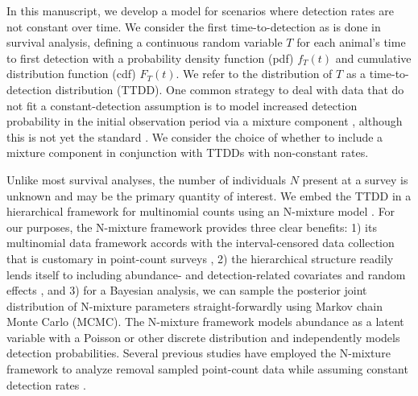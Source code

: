 \documentclass[useAMS,usenatbib,referee,12pt]{article}
\begin{document}

In this manuscript, we develop a model for scenarios where detection rates are not constant over time. 
We consider the first time-to-detection as is done in survival analysis, defining a continuous random variable $T$ for each animal's time to first detection with a probability density function (pdf) $f_T(t)$ and cumulative distribution function (cdf) $F_T(t)$.  
We refer to the distribution of $T$ as a time-to-detection distribution (TTDD).  
One common strategy to deal with data that do not fit a constant-detection assumption is to model increased detection probability in the initial observation period via a mixture component \citep{Farnsworth2002, Farnsworth2005, Alldredge2007, EffordDawson2009, Etterson2009, Reidy2011}, although this is not yet the standard \citep{Solymos2013, Amundson2014, Reidy2016}. 
We consider the choice of whether to include a mixture component in conjunction with TTDDs with non-constant rates.

Unlike most survival analyses, the number of individuals $N$ present at a survey is unknown and may be the primary quantity of interest.  
We embed the TTDD in a hierarchical framework for multinomial counts using an N-mixture model \citep{Wyatt2002, Royle2004NMixture}.  
For our purposes, the N-mixture framework provides three clear benefits: 1) its multinomial data framework accords with the interval-censored data collection that is customary in point-count surveys \citep{Ralph1995}, 2) the hierarchical structure readily lends itself to including abundance- and detection-related covariates and random effects \citep{Dorazio2005, Etterson2009, Amundson2014}, and 3) for a Bayesian analysis, we can sample the posterior joint distribution of N-mixture parameters straight-forwardly using Markov chain Monte Carlo (MCMC).  
The N-mixture framework models abundance as a latent variable with a Poisson or other discrete distribution and independently models detection probabilities.  
Several previous studies have employed the N-mixture framework to analyze removal sampled point-count data while assuming constant detection rates \citep{Royle2004Generalized, Dorazio2005, Etterson2009, Solymos2013, Amundson2014}.  
\end{document}
